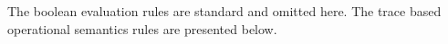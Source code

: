 %
The boolean evaluation rules are standard and omitted here.
The trace based operational semantics rules are presented below.
